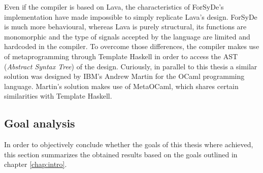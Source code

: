 Even if the compiler is based on Lava, the characteristics of
ForSyDe's implementation have made impossible to simply replicate Lava's
design. ForSyDe is much more behavioural, whereas Lava is purely
structural, its functions are monomorphic and the type of signals
accepted by the language are limited and hardcoded in the compiler. To
overcome those differences, the compiler makes use of metaprogramming
through Template Haskell in order to access the AST (\textit{Abstract
  Syntax Tree}) of the design. Curiously, in parallel to this thesis a
similar solution \cite{ocaml} was designed by IBM's Andrew Martin for the OCaml
programming language. Martin's solution makes use of
MetaOCaml, which shares certain similarities with Template Haskell.


\subsection{Goal analysis}
In order to objectively conclude whether the goals of this thesis
where achieved, this section summarizes the obtained results based on
the goals outlined in chapter \ref{chap:intro}.


